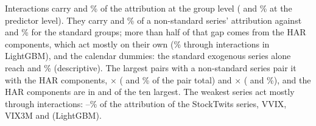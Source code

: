 \begin{itemize}
  Interactions carry \rhfipLgbmInterVar{} and \rhfipXgbInterVar\% of the attribution at the group level
  (\rhfipLgbmInterCol{} and \rhfipXgbInterCol\% at the predictor level). They carry \rhfipLgbmInterNs{} and
  \rhfipXgbInterNs\% of a non-standard series' attribution against \rhfipLgbmInterStd{} and \rhfipXgbInterStd\% for
  the standard groups; more than half of that gap comes from the HAR components, which act mostly on their own
  (\rhfipLgbmInterHar\% through interactions in LightGBM), and the calendar dummies: the standard exogenous series
  alone reach \rhfipLgbmInterStdEx{} and \rhfipXgbInterStdEx\% (descriptive). The largest pairs with a non-standard
  series pair it with the HAR components, \rhfipPairOneA{} $\times$ \rhfipPairOneB{} (\rhfipLgbmPairOne{} and
  \rhfipXgbPairOne\% of the pair total) and \rhfipPairTwoA{} $\times$ \rhfipPairTwoB{} (\rhfipLgbmPairTwo{} and
  \rhfipXgbPairTwo\%), and the HAR components are in \rhfipLgbmPairsHar{} and \rhfipXgbPairsHar{} of the ten largest.
  The weakest series act mostly through interactions: \rhfipLgbmInterWeakMin--\rhfipLgbmInterWeakMax\% of the
  attribution of the StockTwits series, VVIX, VIX3M and \rhfipFomcDay{} (LightGBM).
\end{itemize}



